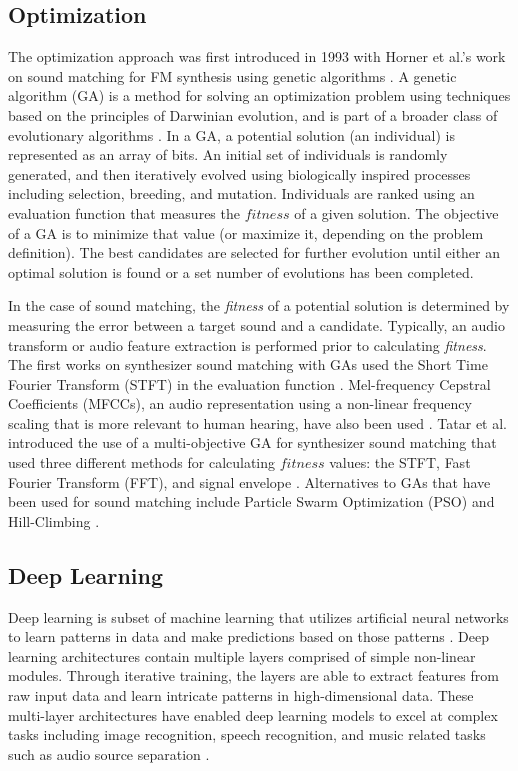 \subsection{Optimization}
The optimization approach was first introduced in 1993 with Horner et al.'s work on sound matching for FM synthesis using genetic algorithms \cite{horner1993machine}. A genetic algorithm (GA) is a method for solving an optimization problem using techniques based on the principles of Darwinian evolution, and is part of a broader class of evolutionary algorithms \cite{whitley1994genetic}. In a GA, a potential solution (an individual) is represented as an array of bits. An initial set of individuals is randomly generated, and then iteratively evolved using biologically inspired processes including selection, breeding, and mutation. Individuals are ranked using an evaluation function that measures the $fitness$ of a given solution. The objective of a GA is to minimize that value (or maximize it, depending on the problem definition). The best candidates are selected for further evolution until either an optimal solution is found or a set number of evolutions has been completed.

In the case of sound matching, the \textit{fitness} of a potential solution is determined by measuring the error between a target sound and a candidate. Typically, an audio transform or audio feature extraction is performed prior to calculating \textit{fitness}. The first works on synthesizer sound matching with GAs used the Short Time Fourier Transform (STFT) in the evaluation function \cite{horner1993machine, horner1995wavetable}. Mel-frequency Cepstral Coefficients (MFCCs), an audio representation using a non-linear frequency scaling that is more relevant to human hearing, have also been used \cite{yee2008synthbot, roth2011comparison, macret2014automatic, smith2017play}. Tatar et al. introduced the use of a multi-objective GA for synthesizer sound matching that used three different methods for calculating $fitness$ values: the STFT, Fast Fourier Transform (FFT), and signal envelope \cite{tatar2016automatic}. Alternatives to GAs that have been used for sound matching include Particle Swarm Optimization (PSO) \cite{heise2009automatic} and Hill-Climbing \cite{roth2011comparison, luke2019stochastic}.

\subsection{Deep Learning}
Deep learning is subset of machine learning that utilizes artificial neural networks to learn patterns in data and make predictions based on those patterns \cite{lecun2015deep}. Deep learning architectures contain multiple layers comprised of simple non-linear modules. Through iterative training, the layers are able to extract features from raw input data and learn intricate patterns in high-dimensional data. These multi-layer architectures have enabled deep learning models to excel at complex tasks including image recognition, speech recognition, and music related tasks such as audio source separation \cite{spleeter2019}.

